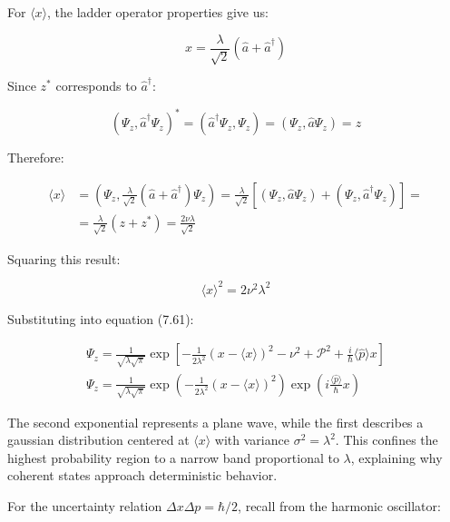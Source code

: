 \documentclass[italian]{HKNdocument}
\begin{document}
For $\langle x\rangle$, the ladder operator properties give us:

\begin{equation*}
x=\frac{\lambda}{\sqrt{2}}\left(\hat{a}+\hat{a}^{\dagger}\right) \tag{7.62}
\end{equation*}

Since $z^{*}$ corresponds to $\hat{a}^{\dagger}$:

\begin{equation*}
\left(\Psi_{z}, \hat{a}^{\dagger} \Psi_{z}\right)^{*}=\left(\hat{a}^{\dagger} \Psi_{z}, \Psi_{z}\right)=\left(\Psi_{z}, \hat{a} \Psi_{z}\right)=z \tag{7.63}
\end{equation*}

Therefore:

\begin{align*}
\langle x\rangle & =\left(\Psi_{z}, \frac{\lambda}{\sqrt{2}}\left(\hat{a}+\hat{a}^{\dagger}\right) \Psi_{z}\right)=\frac{\lambda}{\sqrt{2}}\left[\left(\Psi_{z}, \hat{a} \Psi_{z}\right)+\left(\Psi_{z}, \hat{a}^{\dagger} \Psi_{z}\right)\right]=  \tag{7.64}\\
& =\frac{\lambda}{\sqrt{2}}\left(z+z^{*}\right)=\frac{2 \nu \lambda}{\sqrt{2}}
\end{align*}

Squaring this result:

\begin{equation*}
\langle x\rangle^{2}=2 \nu^{2} \lambda^{2} \tag{7.65}
\end{equation*}

Substituting into equation (7.61):

\begin{gather*}
\Psi_{z}=\frac{1}{\sqrt{\lambda \sqrt{\pi}}} \exp \left[-\frac{1}{2 \lambda^{2}}(x-\langle x\rangle)^{2}-\mathcal{\nu}^{2}+\mathcal{P}^{2}+\frac{i}{\hbar}\langle\hat{p}\rangle x\right]  \tag{7.66}\\
\Psi_{z}=\frac{1}{\sqrt{\lambda \sqrt{\pi}}} \exp \left(-\frac{1}{2 \lambda^{2}}(x-\langle x\rangle)^{2}\right) \exp \left(i \frac{\langle\hat{p}\rangle}{\hbar} x\right) \tag{7.67}
\end{gather*}

The second exponential represents a plane wave, while the first describes a gaussian distribution centered at $\langle x\rangle$ with variance $\sigma^{2}=\lambda^{2}$. This confines the highest probability region to a narrow band proportional to $\lambda$, explaining why coherent states approach deterministic behavior.

For the uncertainty relation $\Delta x \Delta p=\hbar / 2$, recall from the harmonic oscillator:
\end{document}
